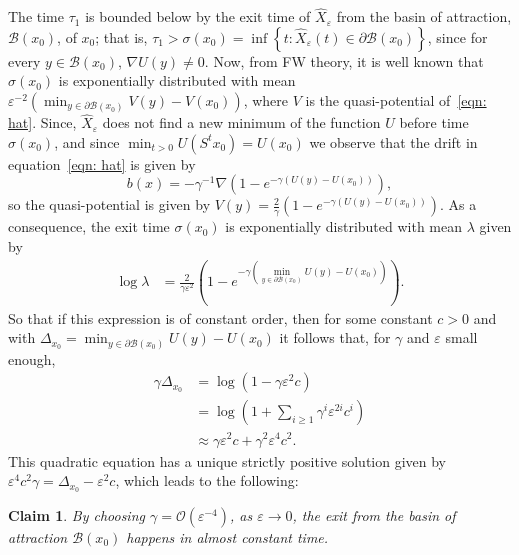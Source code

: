 \documentclass{amsproc}
\newtheorem{claim}[theorem]{Claim}
\newcommand{\eps}{\varepsilon}
\newcommand{\hatx}{\hat X_\eps}
\begin{document}
The time $\tau_1$ is bounded below by the exit time of $\hatx$ from the basin of attraction, $\mathcal{B}(x_0)$, of $x_0$; that is,  
$\tau_1 > \sigma(x_0) = \inf \left \{ t: \hatx(t) \in \partial \mathcal{B}(x_0) \right \}$, since for every $y \in \mathcal{B}(x_0)$, $\nabla U(y)\not = 0$.  Now, from FW theory, it is well known that $\sigma(x_0)$ is exponentially distributed with mean $\eps^{-2} \left( \min_{ y \in \partial \mathcal{B}(x_0) } V(y) - V(x_0) \right )$, where $V$ is the quasi-potential of~\eqref{eqn: hat}. Since, $\hatx$ does not find a new minimum of the function $U$ before time $\sigma(x_0)$, and since $\min_{t>0} U(S^t x_0) = U(x_0)$ we observe that the drift in equation~\eqref{eqn: hat} is given by 
\[
b(x) = - \gamma^{-1} \nabla \left( 1 -  e^{ -\gamma \left (  U(y) - U(x_0)  \right ) } \right),
\]
so the quasi-potential is given by $V(y) = \frac{2}{\gamma}\left(1- e^{ -\gamma \left (  U(y) - U(x_0)  \right ) } \right).$
As a consequence, the exit time $\sigma(x_0)$ is exponentially distributed with mean $\lambda$ given by
\begin{align*}
\log \lambda &= \frac{2}{\gamma \eps^2} \left( 1 -  e^{ -\gamma \left (  \min_{ y \in \partial \mathcal{B}(x_0) } U(y) - U(x_0)  \right ) }  \right).
\end{align*}
So that if this expression is of constant order, then for some constant $c>0$ and with $\Delta_{ x_0 } = \min_{ y \in \partial \mathcal{B}(x_0) } U(y) - U(x_0)$ it follows that, for $\gamma$ and $\eps$ small enough,
\begin{align*}
\gamma \Delta_{x_0} &= \log \left( 1 - \gamma \eps^2 c \right) \\
&=  \log\left(  1 + \sum_{i\geq 1} \gamma^i \eps^{2i} c^i \right)\\
&\approx \gamma \eps^2 c + \gamma^2 \eps^4 c^2.
\end{align*}
This quadratic equation has a unique strictly positive solution given by $\eps^4 c^2 \gamma = \Delta_{x_0} - \eps^2 c$, which leads to the following:

\begin{claim}
By choosing $\gamma = \mathcal{O}( \eps^{-4} )$, as $\eps \to 0$, the exit from the basin of attraction $\mathcal{B}(x_0)$ happens in almost constant time.
\end{claim}
\end{document}
